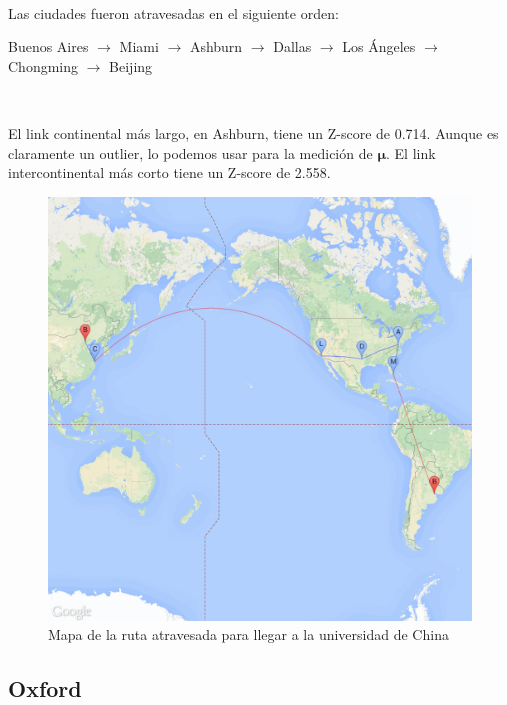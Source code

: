 ~

Las ciudades fueron atravesadas en el siguiente orden:

Buenos Aires $\rightarrow$ Miami $\rightarrow$ Ashburn $\rightarrow$ Dallas $\rightarrow$ Los
\'Angeles $\rightarrow$ Chongming $\rightarrow$ Beijing

~

El link continental m\'as largo, en Ashburn, tiene un Z-score de 0.714. Aunque es claramente un
outlier, lo podemos usar para la medici\'on de $\bm{\mu}$. El link intercontinental m\'as corto
tiene un Z-score de 2.558.

\begin{figure}[H]
	\begin{center}
		  \includegraphics[scale=0.25]{../results/maps/Tsinghua.png}
		  \caption{Mapa de la ruta atravesada para llegar a la universidad de China}
	\end{center}
\end{figure}

\subsection{Oxford}

~

